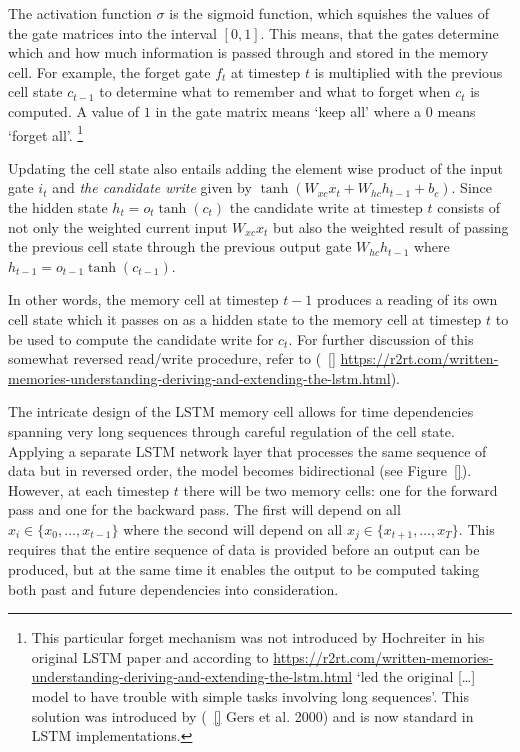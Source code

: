 The activation function $\sigma$ is the sigmoid function, which squishes the
values of the gate matrices into the interval $[0,1]$. This means, that the
gates determine which and how much information is passed through and stored in
the memory cell. For example, the forget gate $f_{t}$ at timestep $t$ is
multiplied with the previous cell state $c_{t-1}$ to determine what to remember
and what to forget when $c_{t}$ is computed. A value of $1$ in the gate matrix
means `keep all' where a $0$ means `forget all'. \footnote{This particular
forget mechanism was not introduced by Hochreiter in his original LSTM paper and
according to
    \url{https://r2rt.com/written-memories-understanding-deriving-and-extending-the-lstm.html}
    `led the original [\ldots] model to have trouble with simple tasks involving
    long sequences'. This solution was introduced by (~\ref{} Gers et al. 2000)
and is now standard in LSTM implementations.}

Updating the cell state also entails adding the element wise product of the
input gate $i_{t}$ and \textit{the candidate write} given by $\tanh(W_{xc}x_{t}
+ W_{hc}h_{t-1} + b_{c})$. Since the hidden state $h_{t} = o_{t}\tanh(c_{t})$
the candidate write at timestep $t$ consists of not only the weighted current
input $W_{xc}x_{t}$ but also the weighted result of passing the previous cell
state through the previous output gate $W_{hc}h_{t-1}$ where $h_{t-1} =
o_{t-1}\tanh(c_{t-1})$.

In other words, the memory cell at timestep $t-1$ produces a reading of its own
cell state which it passes on as a hidden state to the memory cell at timestep
$t$ to be used to compute the candidate write for $c_{t}$. For further
discussion of this somewhat reversed read/write procedure, refer to (~\ref{}
\url{https://r2rt.com/written-memories-understanding-deriving-and-extending-the-lstm.html}).

The intricate design of the LSTM memory cell allows for time dependencies
spanning very long sequences through careful regulation of the cell state.
Applying a separate LSTM network layer that processes the same sequence of data
but in reversed order, the model becomes bidirectional (see Figure~\ref{}).
However, at each timestep $t$ there will be two memory cells: one for the
forward pass and one for the backward pass. The first will depend on all $x_{i}
\in \{x_{0}, \ldots, x_{t-1}\}$ where the second will depend on all $x_{j} \in
\{x_{t+1}, \ldots, x_{T}\}$. This requires that the entire sequence of data is
provided before an output can be produced, but at the same time it enables the
output to be computed taking both past and future dependencies into
consideration.


